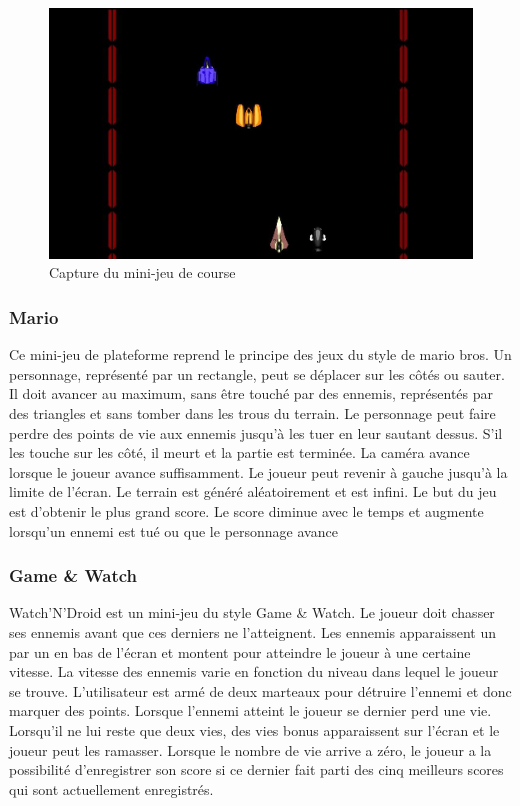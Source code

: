 \begin{figure}
 \includegraphics[width=\linewidth]{img/capturejeu_course}
 \caption{Capture du mini-jeu de course}
 \label{fig:game_course}
\end{figure}

\subsubsection{Mario}

Ce mini-jeu de plateforme reprend le principe des jeux du style de mario bros.
Un personnage, représenté par un rectangle, peut se déplacer sur les côtés ou sauter.
Il doit avancer au maximum, sans être touché par des ennemis, représentés par des triangles et sans tomber dans les trous du terrain.
Le personnage peut faire perdre des points de vie aux ennemis jusqu'à les tuer en leur sautant dessus. S'il les touche sur les côté, 
il meurt et la partie est terminée.
La caméra avance lorsque le joueur avance suffisamment. Le joueur peut revenir à gauche jusqu'à la limite de l'écran.
Le terrain est généré aléatoirement et est infini.
Le but du jeu est d'obtenir le plus grand score. Le score diminue avec le temps et augmente lorsqu'un ennemi est tué ou que le personnage avance

\subsubsection{Game \& Watch}

Watch’N’Droid est un mini-jeu du style Game \& Watch. 
Le joueur doit chasser ses ennemis avant que ces derniers ne l’atteignent. 
Les ennemis apparaissent un par un en bas de l’écran et montent pour atteindre le joueur à une certaine vitesse. La vitesse des ennemis varie en fonction du niveau dans lequel le joueur se trouve. 
L’utilisateur est armé de deux marteaux pour détruire l’ennemi et donc marquer des points. 
Lorsque l’ennemi atteint le joueur se dernier perd une vie. 
Lorsqu’il ne lui reste que deux  vies, des vies bonus apparaissent sur l’écran et le joueur peut les ramasser. 
Lorsque le nombre de vie arrive a zéro, le joueur a la possibilité d’enregistrer son score si ce dernier fait parti des cinq meilleurs scores qui sont actuellement enregistrés.

